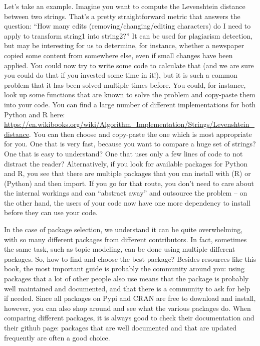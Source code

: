 Let's take an example. Imagine you want to compute the Levenshtein distance between two
strings. That's a pretty straightforward metric that answers the question: ``How many
edits (removing/changing/editing characters) do I need to apply to transform string1 into string2?''
It can be used for plagiarism detection, but may be interesting for us to determine, for instance,
whether a newspaper copied some content from somewhere else, even if small changes have been
applied. You could now try to write some code to calculate that (and we are sure you could
do that if you invested some time in it!), but it is such a common problem that it
has been solved multiple times before. You could, for instance,  look up some
functions that are known to solve the problem and copy-paste them into your code. You can find
a large number of different implementations for both Python and R here:
\url{https://en.wikibooks.org/wiki/Algorithm_Implementation/Strings/Levenshtein\_distance}.
You can then choose and copy-paste the one which is most appropriate for you. One that is very fast, because
you want to compare a huge set of strings? One that is easy to understand? One that uses
only a few lines of code to not distract the reader?
Alternatively, if you look for available packages for Python and R, you see that there are
multiple packages that you can install with  (R) or  (Python)
and then import. If you go for that route, you don't need
to care about the internal workings and can ``abstract away'' and outsource the problem -- on the other
hand, the users of your code now have one more dependency to install before they can
use your code.

In the case of package selection, we understand it can be quite overwhelming,
with so many different packages from different contributors.
In fact, sometimes the same task, such as topic modeling,
can be done using multiple different packages.
So, how to find and choose the best package?
Besides resources like this book, the most important guide is probably the community around you:
using packages that a lot of other people also use means that the package is probably well maintained and documented,
and that there is a community to ask for help if needed.
Since all packages on Pypi and CRAN are free to download and install, however, you can also shop around and see what the various packages do.
When comparing different packages, it is always good to check their documentation and their github page:
packages that are well documented and that are updated frequently are often a good choice.

